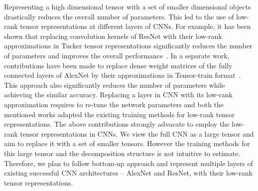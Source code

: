 \documentclass[11pt]{article}
\begin{document}
Representing a high dimensional tensor with a set of smaller dimensional objects drastically reduces the overall number of parameters. This led to the use of low-rank tensor representations at different layers of CNNs. For example, it has been shown that replacing convolution kernels of ResNet with their low-rank approximations in Tucker tensor representations significantly reduces the number of parameters and improves the overall performance~\cite{PSSEG+-ECCV2020}. In a separate work, contributions have been made to replace dense weight matrices of the fully connected layers of AlexNet by their approximations in Tensor-train format~\cite{NPOV-NIPS2015}. This approach also significantly reduces the number of parameters while achieving the similar accuracy. Replacing a layer in CNN with its low-rank approximation requires to re-tune the network parameters and both the mentioned works adapted the existing training methods for low-rank tensor representations. The above contributions strongly advocate to employ the low-rank tensor representations in CNNs. We view the full CNN as a large tensor and aim to replace it with a set of smaller tensors. However the training methods for this large tensor and the decomposition structure is not intuitive to estimate. Therefore, we plan to follow bottom-up approach and represent multiple layers of existing successful CNN architectures -- AlexNet and ResNet, with their low-rank tensor representations.
\end{document}
